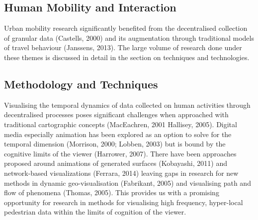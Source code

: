 

\subsection{Human Mobility and Interaction}
Urban mobility research significantly benefited from the decentralised collection of granular data (Castells, 2000) and its augmentation through traditional models of travel behaviour (Janssens, 2013).
The large volume of research done under these themes is discussed in detail in the section on techniques and technologies.

\subsection{Methodology and Techniques}
Visualising the temporal dynamics of data collected on human activities through decentralised processes poses significant challenges when approached with traditional cartographic concepts (MacEachren, 2001 Hallisey, 2005).
Digital media especially animation has been explored as an option to solve for the temporal dimension (Morrison, 2000; Lobben, 2003) but is bound by the cognitive limits of the viewer (Harrower, 2007).
There have been approaches proposed around animations of generated surfaces (Kobayashi, 2011) and network-based visualizations (Ferrara, 2014) leaving gaps in research for new methods in dynamic geo-visualisation (Fabrikant, 2005) and visualising path and flow of phenomena (Thomas, 2005).
This provides us with a promising opportunity for research in methods for visualising high frequency, hyper-local pedestrian data within the limits of cognition of the viewer.

